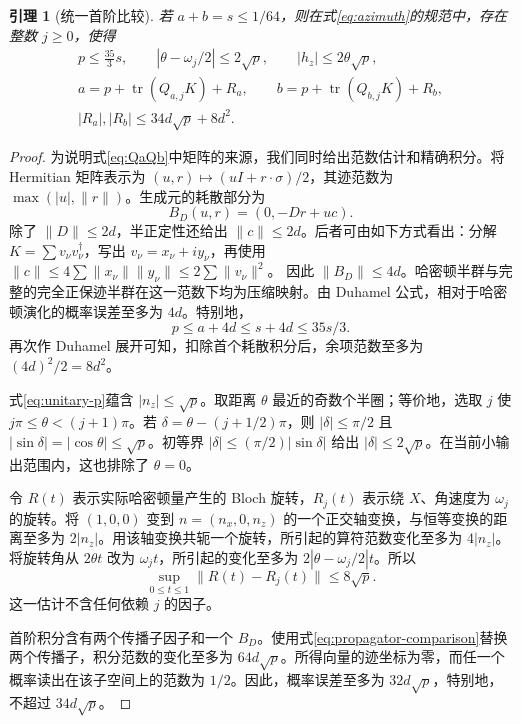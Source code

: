 \documentclass[UTF8,11pt,a4paper,fontset=fandol]{ctexart}
\newtheorem{lemma}[theorem]{引理}
\theoremstyle{definition}
\theoremstyle{remark}
\DeclareMathOperator{\tr}{tr}
\begin{document}
\begin{lemma}[统一首阶比较]\label{lem:uniform-swap}
若 \(a+b=s\leq1/64\)，则在式\eqref{eq:azimuth}的规范中，存在整数 \(j\geq0\)，使得
\begin{gather}\label{eq:angle-comparison}
 p\leq\frac{35}{3}s,\qquad
 |\theta-\omega_j/2|\leq2\sqrt p,\qquad |h_z|\leq2\theta\sqrt p,\\
 \label{eq:uniform-first-order}
 a=p+\tr(Q_{a,j}K)+R_a,\qquad
 b=p+\tr(Q_{b,j}K)+R_b,\\
 \label{eq:uniform-error}
 |R_a|,|R_b|\leq34d\sqrt p+8d^2.
\end{gather}
\end{lemma}
\begin{proof}
为说明式\eqref{eq:QaQb}中矩阵的来源，我们同时给出范数估计和精确积分。将 Hermitian 矩阵表示为 \((u,r)\mapsto(uI+r\cdot\sigma)/2\)，其迹范数为 \(\max(|u|,\|r\|)\)。生成元的耗散部分为
\[
 B_D(u,r)=(0,-Dr+uc).
\]
除了 \(\|D\|\leq2d\)，半正定性还给出 \(\|c\|\leq2d\)。后者可由如下方式看出：分解 \(K=\sum v_\nu v_\nu^\dagger\)，写出 \(v_\nu=x_\nu+iy_\nu\)，再使用
\(\|c\|\leq4\sum\|x_\nu\|\|y_\nu\|\leq2\sum\|v_\nu\|^2\)。
因此 \(\|B_D\|\leq4d\)。哈密顿半群与完整的完全正保迹半群在这一范数下均为压缩映射。由 Duhamel 公式，相对于哈密顿演化的概率误差至多为 \(4d\)。特别地，
\[
 p\leq a+4d\leq s+4d\leq35s/3.
\]
再次作 Duhamel 展开可知，扣除首个耗散积分后，余项范数至多为 \((4d)^2/2=8d^2\)。

式\eqref{eq:unitary-p}蕴含 \(|n_z|\leq\sqrt p\)。取距离 \(\theta\) 最近的奇数个半圈；等价地，选取 \(j\) 使 \(j\pi\leq\theta<(j+1)\pi\)。若 \(\delta=\theta-(j+1/2)\pi\)，则 \(|\delta|\leq\pi/2\) 且 \(|\sin\delta|=|\cos\theta|\leq\sqrt p\)。初等界 \(|\delta|\leq(\pi/2)|\sin\delta|\) 给出 \(|\delta|\leq2\sqrt p\)。在当前小输出范围内，这也排除了 \(\theta=0\)。

令 \(R(t)\) 表示实际哈密顿量产生的 Bloch 旋转，\(R_j(t)\) 表示绕 \(X\)、角速度为 \(\omega_j\) 的旋转。将 \((1,0,0)\) 变到 \(n=(n_x,0,n_z)\) 的一个正交轴变换，与恒等变换的距离至多为 \(2|n_z|\)。用该轴变换共轭一个旋转，所引起的算符范数变化至多为 \(4|n_z|\)。将旋转角从 \(2\theta t\) 改为 \(\omega_jt\)，所引起的变化至多为 \(2|\theta-\omega_j/2|t\)。所以
\begin{equation}\label{eq:propagator-comparison}
 \sup_{0\leq t\leq1}\|R(t)-R_j(t)\|\leq8\sqrt p.
\end{equation}
这一估计不含任何依赖 \(j\) 的因子。

首阶积分含有两个传播子因子和一个 \(B_D\)。使用式\eqref{eq:propagator-comparison}替换两个传播子，积分范数的变化至多为 \(64d\sqrt p\)。所得向量的迹坐标为零，而任一个概率读出在该子空间上的范数为 \(1/2\)。因此，概率误差至多为 \(32d\sqrt p\)，特别地，不超过 \(34d\sqrt p\)。


\end{proof}
\end{document}
